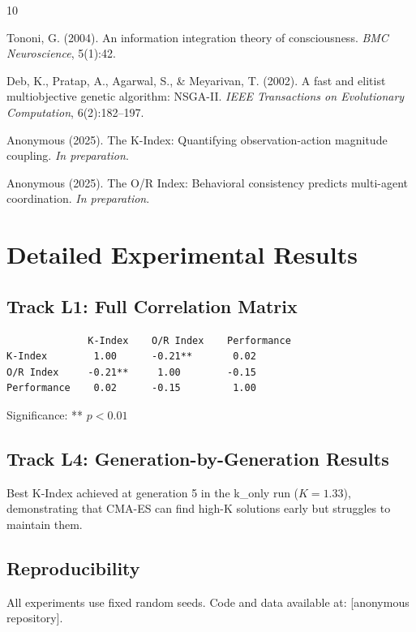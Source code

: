 \documentclass[twoside]{article}
\theoremstyle{remark}
\begin{document}

\begin{thebibliography}{10}

Tononi, G. (2004).
\newblock An information integration theory of consciousness.
\newblock \emph{BMC Neuroscience}, 5(1):42.

Deb, K., Pratap, A., Agarwal, S., \& Meyarivan, T. (2002).
\newblock A fast and elitist multiobjective genetic algorithm: NSGA-II.
\newblock \emph{IEEE Transactions on Evolutionary Computation}, 6(2):182--197.

Anonymous (2025).
\newblock The K-Index: Quantifying observation-action magnitude coupling.
\newblock \emph{In preparation}.

Anonymous (2025).
\newblock The O/R Index: Behavioral consistency predicts multi-agent coordination.
\newblock \emph{In preparation}.

\end{thebibliography}


\appendix

\section{Detailed Experimental Results}

\subsection{Track L1: Full Correlation Matrix}

\begin{verbatim}
              K-Index    O/R Index    Performance
K-Index        1.00      -0.21**       0.02
O/R Index     -0.21**     1.00        -0.15
Performance    0.02      -0.15         1.00
\end{verbatim}

Significance: ** $p < 0.01$

\subsection{Track L4: Generation-by-Generation Results}

Best K-Index achieved at generation 5 in the k\_only run ($K = 1.33$), demonstrating
that CMA-ES can find high-K solutions early but struggles to maintain them.

\subsection{Reproducibility}

All experiments use fixed random seeds. Code and data available at:
[anonymous repository].
\end{document}
